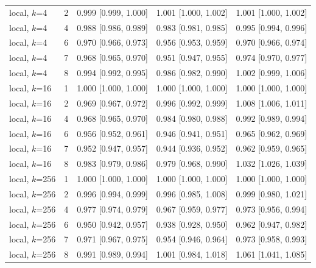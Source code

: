 {\begin{longtable}{llccc}
local, $k$=4 & 2 & 0.999 [0.999, 1.000] & 1.001 [1.000, 1.002] & 1.001 [1.000, 1.002] \\
local, $k$=4 & 4 & 0.988 [0.986, 0.989] & 0.983 [0.981, 0.985] & 0.995 [0.994, 0.996] \\
local, $k$=4 & 6 & 0.970 [0.966, 0.973] & 0.956 [0.953, 0.959] & 0.970 [0.966, 0.974] \\
local, $k$=4 & 7 & 0.968 [0.965, 0.970] & 0.951 [0.947, 0.955] & 0.974 [0.970, 0.977] \\
local, $k$=4 & 8 & 0.994 [0.992, 0.995] & 0.986 [0.982, 0.990] & 1.002 [0.999, 1.006] \\
\midrule
local, $k$=16 & 1 & 1.000 [1.000, 1.000] & 1.000 [1.000, 1.000] & 1.000 [1.000, 1.000] \\
local, $k$=16 & 2 & 0.969 [0.967, 0.972] & 0.996 [0.992, 0.999] & 1.008 [1.006, 1.011] \\
local, $k$=16 & 4 & 0.968 [0.965, 0.970] & 0.984 [0.980, 0.988] & 0.992 [0.989, 0.994] \\
local, $k$=16 & 6 & 0.956 [0.952, 0.961] & 0.946 [0.941, 0.951] & 0.965 [0.962, 0.969] \\
local, $k$=16 & 7 & 0.952 [0.947, 0.957] & 0.944 [0.936, 0.952] & 0.962 [0.959, 0.965] \\
local, $k$=16 & 8 & 0.983 [0.979, 0.986] & 0.979 [0.968, 0.990] & 1.032 [1.026, 1.039] \\
\midrule
local, $k$=256 & 1 & 1.000 [1.000, 1.000] & 1.000 [1.000, 1.000] & 1.000 [1.000, 1.000] \\
local, $k$=256 & 2 & 0.996 [0.994, 0.999] & 0.996 [0.985, 1.008] & 0.999 [0.980, 1.021] \\
local, $k$=256 & 4 & 0.977 [0.974, 0.979] & 0.967 [0.959, 0.977] & 0.973 [0.956, 0.994] \\
local, $k$=256 & 6 & 0.950 [0.942, 0.957] & 0.938 [0.928, 0.950] & 0.962 [0.947, 0.982] \\
local, $k$=256 & 7 & 0.971 [0.967, 0.975] & 0.954 [0.946, 0.964] & 0.973 [0.958, 0.993] \\
local, $k$=256 & 8 & 0.991 [0.989, 0.994] & 1.001 [0.984, 1.018] & 1.061 [1.041, 1.085] \\
\end{longtable}
}
